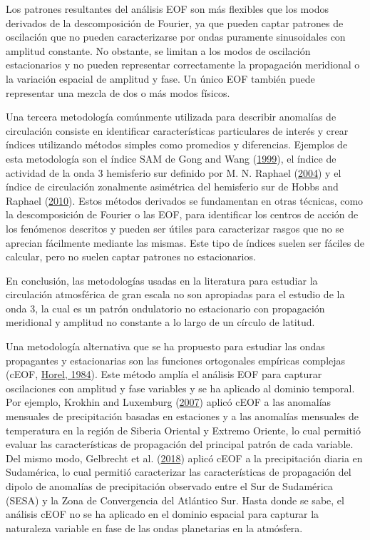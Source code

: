 \documentclass[12pt,oneside,a4paper]{reedthesis}
\begin{document}
Los patrones resultantes del análisis EOF son más flexibles que los modos derivados de la descomposición de Fourier, ya que pueden captar patrones de oscilación que no pueden caracterizarse por ondas puramente sinusoidales con amplitud constante.
No obstante, se limitan a los modos de oscilación estacionarios y no pueden representar correctamente la propagación meridional o la variación espacial de amplitud y fase.
Un único EOF también puede representar una mezcla de dos o más modos físicos.

Una tercera metodología comúnmente utilizada para describir anomalías de circulación consiste en identificar características particulares de interés y crear índices utilizando métodos simples como promedios y diferencias.
Ejemplos de esta metodología son el índice SAM de Gong and Wang (\protect\hyperlink{ref-gong1999}{1999}), el índice de actividad de la onda 3 hemisferio sur definido por M. N. Raphael (\protect\hyperlink{ref-raphael2004}{2004}) y el índice de circulación zonalmente asimétrica del hemisferio sur de Hobbs and Raphael (\protect\hyperlink{ref-hobbs2010}{2010}).
Estos métodos derivados se fundamentan en otras técnicas, como la descomposición de Fourier o las EOF, para identificar los centros de acción de los fenómenos descritos y pueden ser útiles para caracterizar rasgos que no se aprecian fácilmente mediante las mismas.
Este tipo de índices suelen ser fáciles de calcular, pero no suelen captar patrones no estacionarios.

En conclusión, las metodologías usadas en la literatura para estudiar la circulación atmosférica de gran escala no son apropiadas para el estudio de la onda 3, la cual es un patrón ondulatorio no estacionario con propagación meridional y amplitud no constante a lo largo de un círculo de latitud.

Una metodología alternativa que se ha propuesto para estudiar las ondas propagantes y estacionarias son las funciones ortogonales empíricas complejas (cEOF, \protect\hyperlink{ref-horel1984}{Horel, 1984}).
Este método amplía el análisis EOF para capturar oscilaciones con amplitud y fase variables y se ha aplicado al dominio temporal.
Por ejemplo, Krokhin and Luxemburg (\protect\hyperlink{ref-krokhin2007}{2007}) aplicó cEOF a las anomalías mensuales de precipitación basadas en estaciones y a las anomalías mensuales de temperatura en la región de Siberia Oriental y Extremo Oriente, lo cual permitió evaluar las características de propagación del principal patrón de cada variable.
Del mismo modo, Gelbrecht et al. (\protect\hyperlink{ref-gelbrecht2018}{2018}) aplicó cEOF a la precipitación diaria en Sudamérica, lo cual permitió caracterizar las características de propagación del dipolo de anomalías de precipitación observado entre el Sur de Sudamérica (SESA) y la Zona de Convergencia del Atlántico Sur.
Hasta donde se sabe, el análisis cEOF no se ha aplicado en el dominio espacial para capturar la naturaleza variable en fase de las ondas planetarias en la atmósfera.
\end{document}
